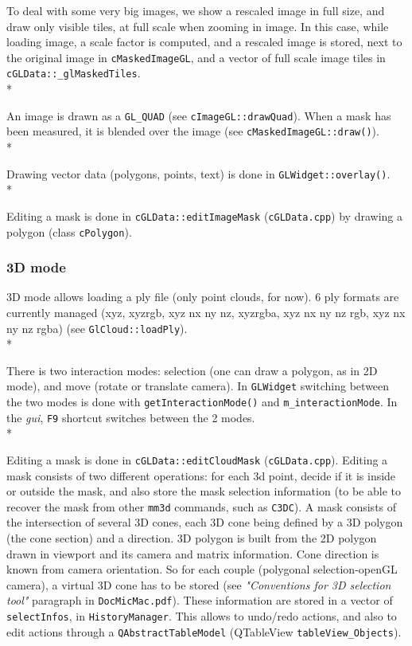 \documentclass[a4paper]{book}
\begin{document}
To deal with some very big images, we show a rescaled image in full size, and draw only visible tiles, at full scale when zooming in image. In this case, while loading image, a scale factor is computed, and a rescaled image is stored, next to the original image in {\tt cMaskedImageGL}, and a vector of full scale image tiles in {\tt cGLData::\_glMaskedTiles}.\\*

An image is drawn as a {\tt GL\_QUAD} (see {\tt cImageGL::drawQuad}). When a mask has been measured, it is blended over the image (see {\tt cMaskedImageGL::draw()}).\\*

Drawing vector data (polygons, points, text) is done in {\tt GLWidget::overlay()}.\\*

Editing a mask is done in {\tt cGLData::editImageMask} ({\tt cGLData.cpp}) by drawing a polygon (class {\tt cPolygon}). 

\subsubsection{3D mode}

3D mode allows loading a ply file (only point clouds, for now). 6 ply formats are currently managed (xyz, xyzrgb, xyz nx ny nz, xyzrgba, xyz nx ny nz rgb, xyz nx ny nz rgba) (see {\tt GlCloud::loadPly}).\\*

There is two interaction modes: selection (one can draw a polygon, as in 2D mode), and move (rotate or translate camera). In {\tt GLWidget} switching between the two modes is done with {\tt getInteractionMode()} and {\tt m\_interactionMode}. In the \textit{gui}, {\tt F9} shortcut switches between the 2 modes.\\*

Editing a mask is done in {\tt cGLData::editCloudMask} ({\tt cGLData.cpp}). Editing a mask consists of two different operations: for each 3d point, decide if it is inside or outside the mask, and also store the mask selection information (to be able to recover the mask from other {\tt mm3d} commands, such as {\tt C3DC}). A mask consists of the intersection of several 3D cones, each 3D cone being defined by a 3D polygon (the cone section) and a direction. 3D polygon is built from the 2D polygon drawn in viewport and its camera and matrix information. Cone direction is known from camera orientation. So for each couple (polygonal selection-openGL camera), a virtual 3D cone has to be stored (see \textit{"Conventions for 3D selection tool"} paragraph in {\tt DocMicMac.pdf}). These information are stored in a vector of {\tt selectInfos}, in {\tt HistoryManager}. This allows to undo/redo actions, and also to edit actions through a {\tt QAbstractTableModel} (QTableView {\tt tableView\_Objects}).
\end{document}
